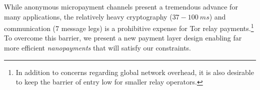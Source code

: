 While anonymous micropayment channels present a tremendous advance for many
applications, the relatively heavy cryptography ($37-100\ ms$) and communication
(7 message legs) is a prohibitive expense for Tor relay payments.\footnote{In
  addition to concerns regarding global network overhead, it is also desirable
  to keep the barrier of entry low for smaller relay operators.} To overcome
this barrier, we present a new payment layer design enabling far more efficient
\emph{nanopayments} that will satisfy our constraints.


